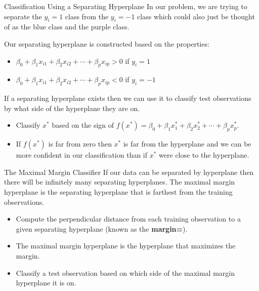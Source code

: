 \documentclass[
  ignorenonframetext,
  aspectratio=169,
]{beamer}
\begin{document}
\begin{frame}{Classification Using a Separating Hyperplane}
\protect\hypertarget{classification-using-a-separating-hyperplane-2}{}
In our problem, we are trying to separate the \(y_i = 1\) class from the
\(y_i = -1\) class which could also just be thought of as the blue class
and the purple class.

Our separating hyperplane is constructed based on the properties:

\begin{itemize}
\item
  \(\beta_{0}+\beta_{1} x_{i 1}+\beta_{2} x_{i 2}+\cdots+\beta_{p} x_{i p}>0\)
  if \(y_{i}=1\)
\item
  \(\beta_{0}+\beta_{1} x_{i 1}+\beta_{2} x_{i 2}+\cdots+\beta_{p} x_{i p}<0\)
  if \(y_{i}=-1\)
\end{itemize}

If a separating hyperplane exists then we can use it to
\alert{classify test observations by what side of the hyperplane they are on}.

\begin{itemize}
\item
  Classify \(x^*\) based on the sign of
  \(f(x^*) = \beta_{0}+\beta_{1} x_{1}^{*}+\beta_{2} x_{2}^{*}+\cdots+\beta_{p} x_{p}^{*}\).
\item
  If \(f(x^*)\) is far from zero then \(x^*\) is far from the hyperplane
  and we can be more confident in our classification than if \(x^*\)
  were close to the hyperplane.
\end{itemize}
\end{frame}

\begin{frame}{The Maximal Margin Classifier}
\protect\hypertarget{the-maximal-margin-classifier}{}
If our data can be separated by hyperplane then there will be infinitely
many separating hyperplanes. The
\alert{maximal margin hyperplane is the separating hyperplane that is farthest from the training observations}.

\begin{itemize}
\item
  Compute the perpendicular distance from each training observation to a
  given separating hyperplane (known as the \textbf{margin=}).
\item
  The maximal margin hyperplane is the hyperplane that maximizes the
  margin.
\item
  Classify a test observation based on which side of the maximal margin
  hyperplane it is on.
\end{itemize}
\end{frame}
\end{document}
